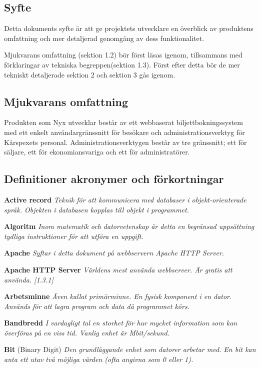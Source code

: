 \documentclass[a4paper, twoside, 11pt, titlepage]{article}
\begin{document}
	\subsection{Syfte}


	Detta dokuments syfte är att ge projektets utvecklare en överblick av produktens omfattning och mer detaljerad genomgång av dess funktionalitet.

	Mjukvarans omfattning (sektion 1.2) bör först läsas igenom, tillsammans med förklaringar av tekniska begreppen(sektion 1.3). Först efter detta bör de mer tekniskt detaljerade sektion 2 och sektion 3 gås igenom.

	\subsection{Mjukvarans omfattning}


	Produkten som Nyx utvecklar består av ett webbaserat biljettbokningssystem med ett enkelt användargränssnitt för besökare och administrationsverktyg för Kårspexets personal. Administrationsverktygen består av tre gränssnitt; ett för säljare, ett för ekonomiansvariga och ett för administratörer.

	\subsection{Definitioner akronymer och förkortningar}


	\textbf{Active record} \emph{Teknik för att kommunicera med databaser i objekt-orienterade språk. Objekten i databasen kopplas till objekt i programmet.}

	\textbf{Algoritm} \emph{Inom matematik och datorvetenskap är detta en begränsad uppsättning tydliga instruktioner för att utföra en uppgift.}

	\textbf{Apache} \emph{Syftar i detta dokument på webbservern Apache HTTP Server.}

	\textbf{Apache HTTP Server} \emph{Världens mest använda webbserver. Är gratis att använda. [1.3.1]}

	\textbf{Arbetsminne} \emph{Även kallat primärminne. En fysisk komponent i en dator. Används för att lagra program och data då programmet körs.}

	\textbf{Bandbredd} \emph{I vardagligt tal en storhet för hur mycket information som kan överföras på en viss tid. Vanlig enhet är Mbit/sekund.}

	\textbf{Bit} (Binary Digit) \emph{Den grundläggande enhet som datorer arbetar med. En bit kan anta ett utav två möjliga värden (ofta angivna som 0 eller 1).}
\end{document}
